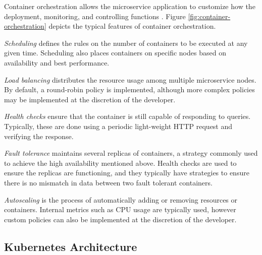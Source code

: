 Container orchestration allows the microservice application to customize how the deployment, monitoring, and controlling functions \cite{casalicchio2019container}. Figure \ref{fig:container-orchestration} depicts the typical features of container orchestration.\par
\textit{Scheduling} defines the rules on the number of containers to be executed at any given time. Scheduling also places containers on specific nodes based on availability and best performance.\par
\textit{Load balancing} distributes the resource usage among multiple microservice nodes. By default, a round-robin policy is implemented, although more complex policies may be implemented at the discretion of the developer.\par
\textit{Health checks} ensure that the container is still capable of responding to queries. Typically, these are done using a periodic light-weight HTTP request and verifying the response.\par
\textit{Fault tolerance} maintains several replicas of containers, a strategy commonly used to achieve the high availability mentioned above. Health checks are used to ensure the replicas are functioning, and they typically have strategies to ensure there is no mismatch in data between two fault tolerant containers.\par
\textit{Autoscaling} is the process of automatically adding or removing resources or containers. Internal metrics such as CPU usage are typically used, however custom policies can also be implemented at the discretion of the developer.\par

\subsection{Kubernetes Architecture}
\label{subsec:k8s-overview}

